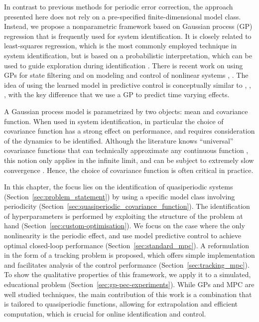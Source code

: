In contrast to previous methods for periodic error correction, the approach
presented here does not rely on a pre-specified finite-di\-men\-sion\-al model
class. Instead, we propose a nonparametric framework based on Gaussian process
(GP) regression that is frequently used for system identification. It is closely
related to least-squares regression, which is the most commonly employed
technique in system identification, but is based on a probabilistic
interpretation, which can be used to guide exploration during identification
. There is recent work on using GPs for state
filtering  and on modeling and control of
nonlinear systems \cite{Pillonetto.Dinuzzo.ea:2014:Kernel},
\cite{Hall.Rasmussen.ea:2012:Modelling}. The idea of using the learned model in
predictive control is conceptually similar to
\cite{Kocijan.Murray-Smith.ea:2004:Gaussian},
\cite{Aswani.Gonzalez.ea:2013:Provably}, \cite{Maciejowski.Yang:2013:Fault},
with the key difference that we use a GP to predict time varying effects.

A Gaussian process model is parametrized
by two objects: mean and covariance function.  When used in system
identification, in particular the choice of covariance function has a strong
effect on performance, and requires consideration of the dynamics to
be identified. Although the literature knows ``universal'' covariance functions
that can technically approximate any continuous function
%
, this notion only
applies in the infinite limit, and can be subject to extremely slow convergence
%
%
. Hence, the choice of covariance
function is often critical in practice.

In this chapter, the focus lies on the identification of quasiperiodic systems
(Section~\ref{sec:problem_statement}) by using a specific model class involving
periodicity (Section~\ref{sec:quasiperiodic_covariance_function}). The
identification of hyperparameters is performed by exploiting the structure of
the problem at hand (Section~\ref{sec:custom-optimisation}). We focus on the
case where the only nonlinearity is the periodic effect, and use model
predictive control to achieve optimal closed-loop performance
(Section~\ref{sec:standard_mpc}). A reformulation in the form of a tracking
problem is proposed, which offers simple implementation and facilitates
analysis of the control performance (Section~\ref{sec:tracking_mpc}). To show
the qualitative properties of this framework, we apply it to a simulated,
educational problem (Section~\ref{sec:gp-pec-experiments}). While GPs and MPC
are well studied techniques, the main contribution of this work is a
combination that is tailored to quasiperiodic functions, allowing for
extrapolation and efficient computation, which is crucial for online
identification and control.

